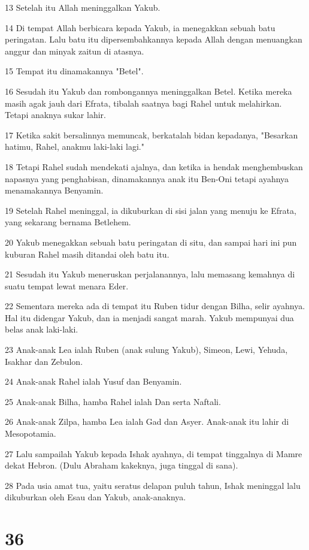 \par 13 Setelah itu Allah meninggalkan Yakub.
\par 14 Di tempat Allah berbicara kepada Yakub, ia menegakkan sebuah batu peringatan. Lalu batu itu dipersembahkannya kepada Allah dengan menuangkan anggur dan minyak zaitun di atasnya.
\par 15 Tempat itu dinamakannya "Betel".
\par 16 Sesudah itu Yakub dan rombongannya meninggalkan Betel. Ketika mereka masih agak jauh dari Efrata, tibalah saatnya bagi Rahel untuk melahirkan. Tetapi anaknya sukar lahir.
\par 17 Ketika sakit bersalinnya memuncak, berkatalah bidan kepadanya, "Besarkan hatimu, Rahel, anakmu laki-laki lagi."
\par 18 Tetapi Rahel sudah mendekati ajalnya, dan ketika ia hendak menghembuskan napasnya yang penghabisan, dinamakannya anak itu Ben-Oni tetapi ayahnya menamakannya Benyamin.
\par 19 Setelah Rahel meninggal, ia dikuburkan di sisi jalan yang menuju ke Efrata, yang sekarang bernama Betlehem.
\par 20 Yakub menegakkan sebuah batu peringatan di situ, dan sampai hari ini pun kuburan Rahel masih ditandai oleh batu itu.
\par 21 Sesudah itu Yakub meneruskan perjalanannya, lalu memasang kemahnya di suatu tempat lewat menara Eder.
\par 22 Sementara mereka ada di tempat itu Ruben tidur dengan Bilha, selir ayahnya. Hal itu didengar Yakub, dan ia menjadi sangat marah. Yakub mempunyai dua belas anak laki-laki.
\par 23 Anak-anak Lea ialah Ruben (anak sulung Yakub), Simeon, Lewi, Yehuda, Isakhar dan Zebulon.
\par 24 Anak-anak Rahel ialah Yusuf dan Benyamin.
\par 25 Anak-anak Bilha, hamba Rahel ialah Dan serta Naftali.
\par 26 Anak-anak Zilpa, hamba Lea ialah Gad dan Asyer. Anak-anak itu lahir di Mesopotamia.
\par 27 Lalu sampailah Yakub kepada Ishak ayahnya, di tempat tinggalnya di Mamre dekat Hebron. (Dulu Abraham kakeknya, juga tinggal di sana).
\par 28 Pada usia amat tua, yaitu seratus delapan puluh tahun, Ishak meninggal lalu dikuburkan oleh Esau dan Yakub, anak-anaknya.

\chapter{36}

